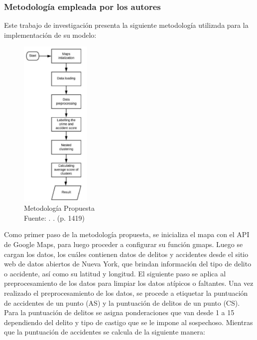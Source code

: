 \subsubsection{Metodología empleada por los autores}
Este trabajo de investigación presenta la siguiente metodología utilizada para la implementación de su modelo:

\begin{figure}[h]
	\begin{center}
		\includegraphics[width=0.30\textwidth]{2/figures/routeMet.jpg}
		\caption{Metodología Propuesta \\
			Fuente: \citep*{pr_Soni}. . (p. 1419)}
		\label{1:fig2}
	\end{center}
\end{figure}
Como primer paso de la metodología propuesta, se inicializa el mapa con el API de Google Maps, para luego proceder a configurar su función gmaps. Luego se cargan los datos, los cuáles contienen datos de delitos y accidentes desde el sitio web de datos abiertos de Nueva York, que brindan información del tipo de delito o accidente, así como su latitud y longitud. El siguiente paso se aplica al preprocesamiento de los datos para limpiar los datos atípicos o faltantes.
Una vez realizado el preprocesamiento de los datos, se procede a etiquetar la puntuación de accidentes de un punto (AS) y la puntuación de delitos de un punto (CS). Para la puntuación de delitos se asigna ponderaciones que van desde 1 a 15 dependiendo del delito y tipo de castigo que se le impone al sospechoso. Mientras que la puntuación de accidentes se calcula de la siguiente manera:

